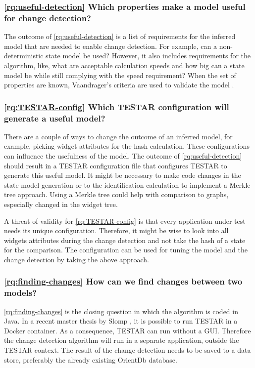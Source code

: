 \subsubsection{\ref{rq:useful-detection} Which properties make a model useful for change detection?}
The outcome of \ref{rq:useful-detection} is a list of requirements for the inferred model that are needed to enable change detection. For example, can a non-deterministic state model be used? However, it also includes requirements for the algorithm, like, what are acceptable calculation speeds and how big can a state model be while still complying with the speed requirement? When the set of properties are known, Vaandrager's criteria are used to validate the model \cite{vaandrager}.

\subsubsection{\ref{rq:TESTAR-config} Which TESTAR configuration will generate a useful model?}
There are a couple of ways to change the outcome of an inferred model, for example, picking widget attributes for the hash calculation. These configurations can influence the usefulness of the model. The outcome of \ref{rq:useful-detection} should result in a TESTAR configuration file that configures TESTAR to generate this useful model. It might be necessary to make code changes in the state model generation or to the identification calculation to implement a Merkle tree approach. Using a Merkle tree could help with comparison to graphs, especially changed in the widget tree. 

A threat of validity for \ref{rq:TESTAR-config} is that every application under test needs its unique configuration. Therefore, it might be wise to look into all widgets attributes during the change detection and not take the hash of a state for the comparison. The configuration can be used for tuning the model and the change detection by taking the above approach.

\subsubsection{\ref{rq:finding-changes} How can we find changes between two models?}
\ref{rq:finding-changes} is the closing question in which the algorithm is coded in Java. In a recent master thesis by Slomp \cite{thesisSlomp}, it is possible to run TESTAR in a Docker container. As a consequence, TESTAR can run without a GUI. Therefore the change detection algorithm will run in a separate application, outside the TESTAR context. The result of the change detection needs to be saved to a data store, preferably the already existing OrientDb database. 

